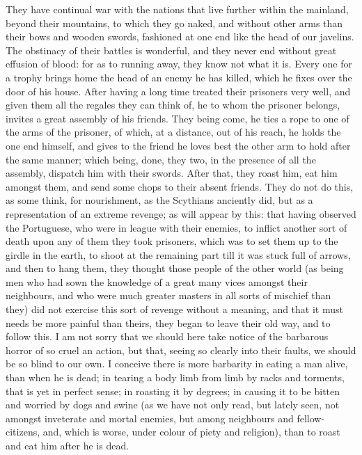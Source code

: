 \documentclass[twocolumn]{article}
\newcommand{\specialbreaks}[1]{\linebreak\newpage\noindent\setline{#1}}
\begin{document}
	They have continual war with the nations that live further within the mainland, beyond their mountains, to which they go naked, and without other arms than their bows and wooden swords, fashioned at one end like the head of our javelins. The obstinacy of their battles is wonderful, and they never end without great effusion of blood: for as to running away, they know not what it is. Every one for a trophy brings home the head of an enemy he has killed, which he fixes over the door of his house. After having a long time treated their prisoners very well, and given them all the regales they can think of, he to whom the prisoner belongs, invites a great assembly of his friends. They being come, he ties a rope to one of the arms of the prisoner, of which, at a distance, out of his reach, he holds the one end himself, and gives to the friend he loves best the other arm to hold after the same manner; which being, done, \specialbreaks{353}they two, in the presence of all the assembly, dispatch him with their swords. After that, they roast him, eat him amongst them, and send some chops to their absent friends. They do not do this, as some think, for nourishment, as the Scythians anciently did, but as a representation of an extreme revenge; as will appear by this: that having observed the Portuguese, who were in league with their enemies, to inflict another sort of death upon any of them they took prisoners, which was to set them up to the girdle in the earth, to shoot at the remaining part till it was stuck full of arrows, and then to hang them, they thought those people of the other world (as being men who had sown the knowledge of a great many vices amongst their neighbours, and who were much greater masters in all sorts of mischief than they) did not exercise this sort of revenge without a meaning, and that it must needs be more painful than theirs, they began to leave their old way, and to follow this. I am not sorry that we should here take notice of the barbarous horror of so cruel an action, but that, seeing so clearly into their faults, we should be so blind to our own. I conceive there is more barbarity in eating a man alive, than when he is dead; in tearing a body limb from limb by racks and torments, that is yet in perfect sense; in roasting it by degrees; in causing it to be bitten and worried by dogs and swine (as we have not only read, but lately seen, not amongst inveterate and mortal enemies, but among neighbours and fellow-citizens, and, which is worse, under colour of piety and religion), than to roast and eat him after he is dead.
\end{document}
